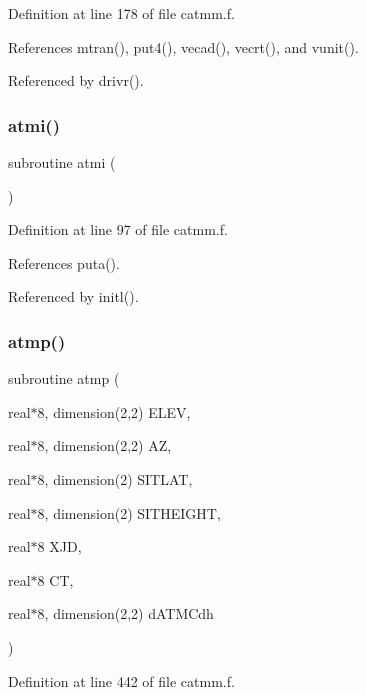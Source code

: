 Definition at line 178 of file catmm.\+f.



References mtran(), put4(), vecad(), vecrt(), and vunit().



Referenced by drivr().

\mbox{\label{catmm_8f_a64b184fffb62b358507fa3f7674dd19b}} 
\subsubsection{\texorpdfstring{atmi()}{atmi()}}
{\footnotesize\ttfamily subroutine atmi (\begin{DoxyParamCaption}{ }\end{DoxyParamCaption})}



Definition at line 97 of file catmm.\+f.



References puta().



Referenced by initl().

\mbox{\label{catmm_8f_a91aa038b0d7e40d535c1f571d5d8d8af}} 
\subsubsection{\texorpdfstring{atmp()}{atmp()}}
{\footnotesize\ttfamily subroutine atmp (\begin{DoxyParamCaption}\item[{real$\ast$8, dimension(2,2)}]{E\+L\+EV,  }\item[{real$\ast$8, dimension(2,2)}]{AZ,  }\item[{real$\ast$8, dimension(2)}]{S\+I\+T\+L\+AT,  }\item[{real$\ast$8, dimension(2)}]{S\+I\+T\+H\+E\+I\+G\+HT,  }\item[{real$\ast$8}]{X\+JD,  }\item[{real$\ast$8}]{CT,  }\item[{real$\ast$8, dimension(2,2)}]{d\+A\+T\+M\+Cdh }\end{DoxyParamCaption})}



Definition at line 442 of file catmm.\+f.



